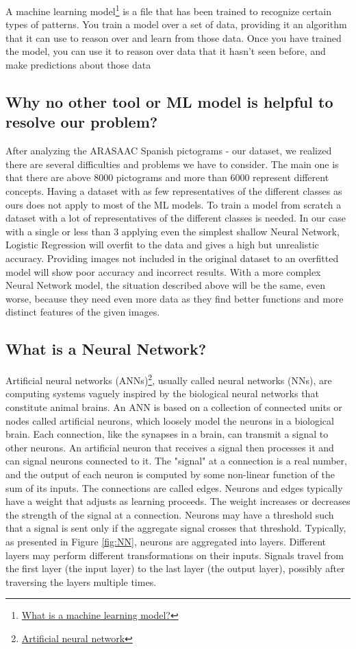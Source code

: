 A machine learning model\footnote{\href{https://docs.microsoft.com/en-us/windows/ai/windows-ml/what-is-a-machine-learning-model}{What is a machine learning model?}} is a file that has been trained to recognize certain types of patterns. You train a model over a set of data, providing it an algorithm that it can use to reason over and learn from those data.
Once you have trained the model, you can use it to reason over data that it hasn't seen before, and make predictions about those data

\subsection{Why no other tool or ML model is helpful to resolve our problem?}
After analyzing the ARASAAC Spanish pictograms - our dataset, we realized there are several difficulties and problems we have to consider. The main one is that there are above 8000 pictograms and more than 6000 represent different concepts. 
Having a dataset with as few representatives of the different classes as ours does not apply to most of the ML models. To train a model from scratch a dataset with a lot of representatives of the different classes is needed. In our case with a single or less than 3 applying even the simplest shallow Neural Network, Logistic Regression will overfit to the data and gives a high but unrealistic accuracy. Providing images not included in the original dataset to an overfitted model will show poor accuracy and incorrect results. With a more complex Neural Network model, the situation described above  will be the same, even worse, because they need even more data as they find better functions and more distinct features of the given images.

\subsection{What is a Neural Network?}
Artificial neural networks (ANNs)\footnote{\href{https://en.wikipedia.org/wiki/Artificial_neural_network}{Artificial neural network}}, usually called neural networks (NNs), are computing systems vaguely inspired by the biological neural networks that constitute animal brains.
An ANN is based on a collection of connected units or nodes called artificial neurons, which loosely model the neurons in a biological brain. Each connection, like the synapses in a brain, can transmit a signal to other neurons. An artificial neuron that receives a signal then processes it and can signal neurons connected to it. The "signal" at a connection is a real number, and the output of each neuron is computed by some non-linear function of the sum of its inputs. The connections are called edges. Neurons and edges typically have a weight that adjusts as learning proceeds. The weight increases or decreases the strength of the signal at a connection. Neurons may have a threshold such that a signal is sent only if the aggregate signal crosses that threshold. Typically, as presented in Figure \ref{fig:NN}, neurons are aggregated into layers. Different layers may perform different transformations on their inputs. Signals travel from the first layer (the input layer) to the last layer (the output layer), possibly after traversing the layers multiple times.
   
